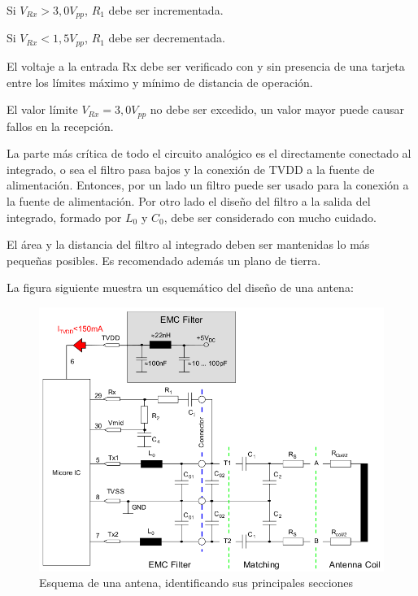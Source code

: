 \bigskip
Si $V_{Rx} > 3,0V_{pp}$,  $R_{1}$ debe ser incrementada.

\bigskip
Si $V_{Rx} < 1,5V_{pp}$,  $R_{1}$ debe ser decrementada.

\bigskip
El voltaje a la entrada Rx debe ser verificado con y sin presencia de una tarjeta entre los límites máximo y mínimo de distancia de operación.

\bigskip
\begin{itshape}
El valor límite  $V_{Rx}= 3,0V_{pp}$ no debe ser excedido, un valor mayor puede causar fallos en la recepción.
\end{itshape}

\bigskip
\bigskip
{}

\bigskip
{}

\bigskip
La parte más crítica de todo el circuito analógico es el directamente conectado al integrado, o sea el filtro pasa bajos y la conexión de TVDD a la fuente de alimentación.
Entonces, por un lado un filtro puede ser usado para la conexión a la fuente de alimentación.
Por otro lado el diseño del filtro a la salida del integrado, formado por $L_{0}$ y $C_{0}$, debe ser considerado con mucho cuidado. \begin{itshape} El área y la distancia del filtro al integrado deben ser mantenidas lo más pequeñas posibles. Es recomendado además un plano de tierra.	
\end{itshape}

\bigskip
La figura siguiente muestra un esquemático del diseño de una antena:

\begin{figure}[H]
\centering
  \begin{center}
  \includegraphics[scale=.4]{Imagenes/anexo2.png} 
  \end{center}
  \caption{Esquema de una antena, identificando sus principales secciones}\label{Fig:HW} 
\end{figure}


